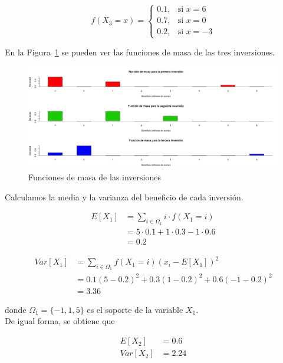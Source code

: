 \documentclass[12pt,a4paper,twoside,openright,titlepage,final]{article}
\begin{document}
\begin{equation*}
f(X_3 = x) = \begin{cases}
0.1, & \text{si } x = 6 \\
0.7, & \text{si } x = 0 \\
0.2, & \text{si } x = -3
\end{cases}
\end{equation*}

En la Figura~\ref{fig:funciones_masa_inversiones} se pueden ver las funciones de masa de las tres inversiones.\\ 

\begin{figure}[tbph!]
\centering
\includegraphics[width=0.9\linewidth]{imagenes/funciones_masa_inversiones}
\caption{Funciones de masa de las inversiones}
\label{fig:funciones_masa_inversiones}
\end{figure}

Calculamos la media y la varianza del beneficio de cada inversión.

\begin{align*}
E[X_1] & = \sum_{i \in \Omega_1} i\cdot f(X_1 = i) \\ & = 5 \cdot 0.1 + 1 \cdot 0.3 - 1 \cdot 0.6 \\ & = 0.2
\end{align*}

\begin{align*}
Var[X_1] & = \sum_{i \in \Omega_1} f(X_1 = i) (x_i - E[X_1])^2 \\ & = 0.1(5 - 0.2)^2 + 0.3(1-0.2)^2 + 0.6(-1 - 0.2)^2 \\ & = 3.36
\end{align*}

donde $\Omega_1 = \{-1, 1, 5\}$ es el soporte de la variable $X_1$.\\

De igual forma, se obtiene que 

\begin{align*}
E[X_2] & = 0.6 \\
Var[X_2] & = 2.24
\end{align*}
\end{document}
